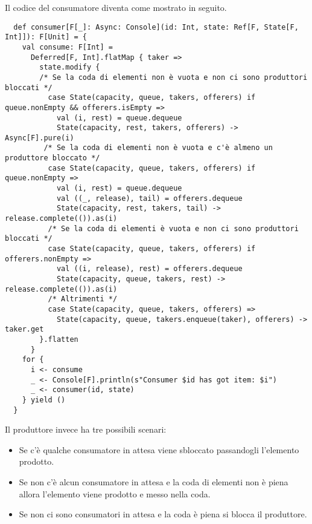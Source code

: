 Il codice del consumatore diventa come mostrato in seguito. 
\begin{verbatim}
  def consumer[F[_]: Async: Console](id: Int, state: Ref[F, State[F, Int]]): F[Unit] = {
    val consume: F[Int] =
      Deferred[F, Int].flatMap { taker =>
        state.modify {
        /* Se la coda di elementi non è vuota e non ci sono produttori bloccati */
          case State(capacity, queue, takers, offerers) if queue.nonEmpty && offerers.isEmpty =>
            val (i, rest) = queue.dequeue
            State(capacity, rest, takers, offerers) -> Async[F].pure(i)
         /* Se la coda di elementi non è vuota e c'è almeno un produttore bloccato */
          case State(capacity, queue, takers, offerers) if queue.nonEmpty =>
            val (i, rest) = queue.dequeue
            val ((_, release), tail) = offerers.dequeue
            State(capacity, rest, takers, tail) -> release.complete(()).as(i)
          /* Se la coda di elementi è vuota e non ci sono produttori bloccati */
          case State(capacity, queue, takers, offerers) if offerers.nonEmpty =>
            val ((i, release), rest) = offerers.dequeue
            State(capacity, queue, takers, rest) -> release.complete(()).as(i)
          /* Altrimenti */
          case State(capacity, queue, takers, offerers) =>
            State(capacity, queue, takers.enqueue(taker), offerers) -> taker.get
        }.flatten
      }
    for {
      i <- consume
      _ <- Console[F].println(s"Consumer $id has got item: $i")
      _ <- consumer(id, state)
    } yield ()
  }
\end{verbatim}

\noindent Il produttore invece ha tre possibili scenari:
\begin{itemize}
    \item Se c’è qualche consumatore in attesa viene sbloccato passandogli l’elemento prodotto.
    \item  Se non c’è alcun consumatore in attesa e la coda di elementi non è piena allora l’elemento viene prodotto e messo nella coda.
    \item Se non ci sono consumatori in attesa e la coda è piena si blocca il produttore.
\end{itemize}

